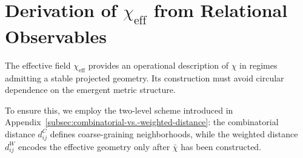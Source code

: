 \section{Derivation of \texorpdfstring{$\chi_{\mathrm{eff}}$}{χeff} from Relational Observables}
  \label{app:chi-eff-derivation}

  The effective field $\chi_{\mathrm{eff}}$ provides an operational
  description of $\chi$ in regimes admitting a stable projected
  geometry. Its construction must avoid circular dependence on
  the emergent metric structure.

  To ensure this, we employ the two-level scheme introduced in
  Appendix~\ref{subsec:combinatorial-vs.-weighted-distance}:
  the combinatorial distance $d_{ij}^{C}$ defines coarse-graining
  neighborhoods, while the weighted distance $d_{ij}^{W}$
  encodes the effective geometry only after $\bar{\chi}$ has been
  constructed.

  
  
  
  
